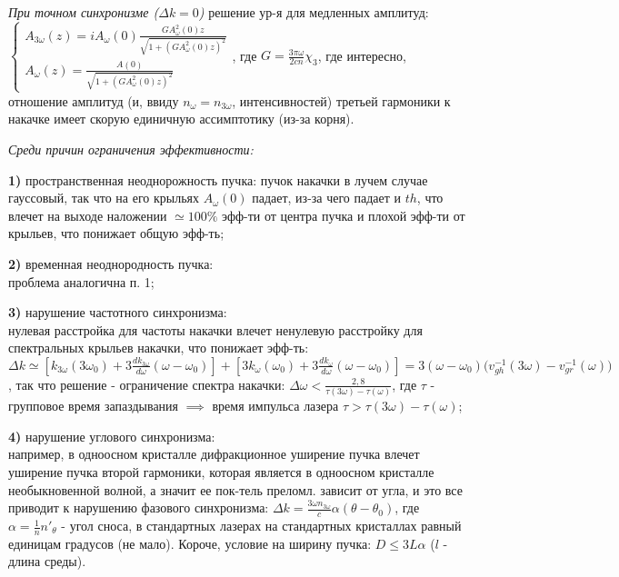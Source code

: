 \documentclass[a4paper,12pt]{article}
\theoremstyle{definition} %
\theoremstyle{definition} %
\theoremstyle{remark} %
\begin{document}
\textit{При точном синхронизме ($\Delta k = 0$)} решение ур-я для медленных амплитуд: \\$
	\begin{cases}
		A_{3\omega}(z)=iA_{\omega}(0)\frac{GA_{\omega}^{2}(0)z}{\sqrt{1+(GA_{\omega}^{2}(0)z)^{2}}} \\
		A_{\omega}(z)=\frac{A(0)}{\sqrt{1+(GA_{\omega}^{2}(0)z)^{2}}}
	\end{cases}$, где $G=\frac{3\pi \omega}{2cn}\chi_{3}$, где интересно, отношение амплитуд (и, ввиду $n_{\omega}=n_{3\omega}$, интенсивностей) третьей гармоники к накачке имеет скорую единичную ассимптотику (из-за корня).


\textit{Среди причин ограничения эффективности:}
	\par \textbf{1)} пространственная неоднорожность пучка:
	пучок накачки в лучем случае гауссовый, так что на его крыльях $A_{\omega}(0)$ падает, из-за чего падает и $th$, что влечет на выходе наложении $\simeq 100\%$ эфф-ти от центра пучка и плохой эфф-ти от крыльев, что понижает общую эфф-ть; \\
	\par \textbf{2)} временная неоднородность пучка: \\
	проблема аналогична п. 1; \\
	\par \textbf{3)} нарушение частотного синхронизма: \\
	нулевая расстройка для частоты накачки влечет ненулевую расстройку для спектральных крыльев накачки, что понижает эфф-ть: $\Delta k \simeq [k_{3\omega}(3\omega_{0})+3\frac{dk_{3\omega}}{d\omega}(\omega-\omega_{0})]+[3k_{\omega}(\omega_{0})+3\frac{dk_{\omega}}{d\omega}(\omega-\omega_{0})] = 3(\omega-\omega_{0}) \big( v_{gh}^{-1}(3\omega) - v_{gr}^{-1}(\omega) \big)$, так что решение - ограничение спектра накачки: $\Delta \omega < \frac{2,8}{\tau (3\omega) - \tau (\omega)}$, где $\tau$ - групповое время запаздывания $\implies$ время импульса лазера $\tau > \tau(3\omega)-\tau(\omega)$; \\ 
	\par \textbf{4)} нарушение углового синхронизма: \\
	например, в одноосном кристалле дифракционное уширение пучка влечет уширение пучка второй гармоники, которая является в одноосном кристалле необыкновенной волной, а значит ее пок-тель преломл. зависит от угла, и это все приводит к нарушению фазового синхронизма: $\Delta k = \frac{3\omega n_{3\omega}}{c}\alpha (\theta - \theta_{0})$, где $\alpha = \frac{1}{n}n'_{\theta}$ - угол сноса, в стандартных лазерах на стандартных кристаллах равный единицам градусов (не мало). Короче, условие на ширину пучка: $D \leq 3L \alpha$ ($l$ - длина среды).
\end{document}
